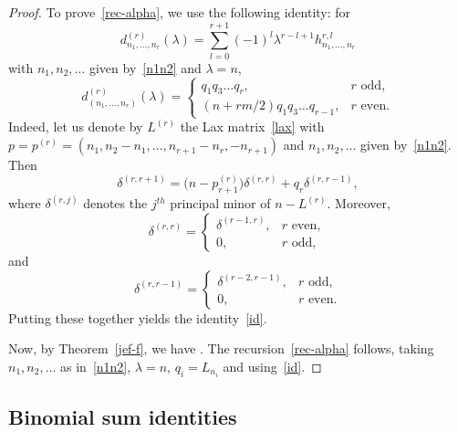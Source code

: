 \documentclass[pdftex]{sigma}
\theoremstyle{definition}
\begin{document}
\begin{proof}
To prove~\eqref{rec-alpha}, we use the following identity: for
\[d^{(r)}_{n_1,\dots,n_r}(\lambda) = \sum_{l=0}^{r+1} (-1)^l \lambda^{r-l+1} h^{r,l}_{n_1,\dots,n_r}\]
with $n_1,n_2,\dots$ given by~\eqref{n1n2} and $\lambda=n$,
\begin{equation}
\label{id} d^{(r)}_{(n_1,\dots,n_r)}(\lambda)=
\begin{cases} q_1q_3 \dots q_r, & r \mbox{ odd},\\
(n+rm/2) q_1q_3 \dots q_{r-1} ,& r \mbox{ even}.\end{cases}\end{equation}
Indeed, let us denote by $L^{(r)}$ the Lax matrix~\eqref{lax} with
$p=p^{(r)}=(n_1,n_2-n_1,\dots,n_{r+1}-n_r,-n_{r+1})$
and $n_1,n_2,\dots$ given by~\eqref{n1n2}.
Then
\[\delta^{(r,r+1)} = \big(n-p^{(r)}_{r+1}\big) \delta^{(r,r)} + q_r \delta^{(r,r-1)},\]
where $\delta^{(r,j)}$ denotes the $j^{th}$ principal minor of $n-L^{(r)}$.
Moreover,
\[\delta^{(r,r)}=\begin{cases}
\delta^{(r-1,r)}, & r \mbox{ even},\\
0, & r \mbox{ odd},\end{cases}\]
and
\[\delta^{(r,r-1)}=\begin{cases}
\delta^{(r-2,r-1)}, & r \mbox{ odd},\\
0 ,& r \mbox{ even}.\end{cases}\]
Putting these together yields the identity~\eqref{id}.

Now, by Theorem~\ref{jef-f}, we have
.
The recursion~\eqref{rec-alpha} follows, taking
$n_1,n_2,\dots$ as in~\eqref{n1n2}, $\lambda=n$, $q_i= L_{n_i}$
and using~\eqref{id}.
\end{proof}

\subsection{Binomial sum identities}\label{bs}
\end{document}
